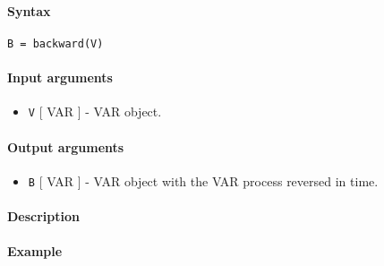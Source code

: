 


	\paragraph{Syntax}

\begin{verbatim}
B = backward(V)
\end{verbatim}

\paragraph{Input arguments}

\begin{itemize}
\itemsep1pt\parskip0pt
\item
  \texttt{V} {[} VAR {]} - VAR object.
\end{itemize}

\paragraph{Output arguments}

\begin{itemize}
\itemsep1pt\parskip0pt
\item
  \texttt{B} {[} VAR {]} - VAR object with the VAR process reversed in
  time.
\end{itemize}

\paragraph{Description}

\paragraph{Example}


